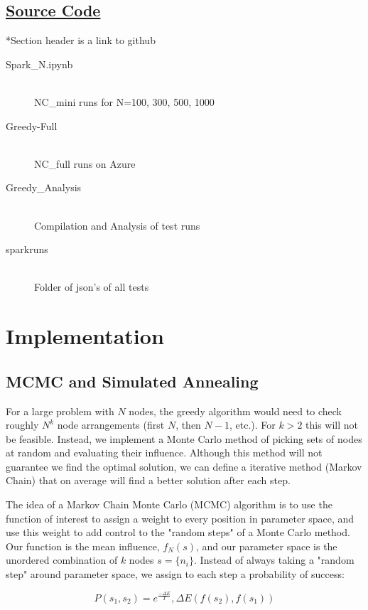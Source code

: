 \documentclass{article}
\begin{document}
	\subsection{\href{https://github.com/chuckyouliu/Influence-Maximization}{Source Code}}

	*Section header is a link to github

	\begin{description}
		\item[Spark\_N.ipynb] \hfill \\
			NC\_mini runs for N=100, 300, 500, 1000
		\item[Greedy-Full] \hfill \\
			NC\_full runs on Azure
		\item[Greedy\_Analysis] \hfill \\
			Compilation and Analysis of test runs
		\item[sparkruns] \hfill \\
			Folder of json's of all tests
	\end{description}

	\section{Implementation}
	
	\subsection{MCMC and Simulated Annealing}
	For a large problem with $N$ nodes, the greedy algorithm would need to check roughly $N^k$ node arrangements (first $N$, then $N-1$, etc.). For $k > 2$ this will not be feasible. Instead, we implement a Monte Carlo method of picking sets of nodes at random and evaluating their influence. Although this method will not guarantee we find the optimal solution, we can define a iterative method (Markov Chain) that on average will find a better solution after each step.
		
	The idea of a Markov Chain Monte Carlo (MCMC) algorithm is to use the function of interest to assign a weight to every position in parameter space, and use this weight to add control to the "random steps" of a Monte Carlo method. Our function is the mean influence, $f_N(s)$, and our parameter space is the unordered combination of $k$ nodes $s = \{n_i\}$. Instead of always taking a "random step" around parameter space, we assign to each step a probability of success:
		
		\begin{equation}
		\boxed{
			P(s_1,s_2) = e^\frac{-\Delta E}{T}, \Delta E(f(s_2),f(s_1))
		}
		\end{equation}
		
\end{document}
